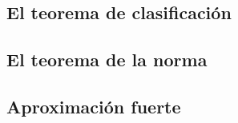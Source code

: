 
\subsection{El teorema de clasificaci\'{o}n}

\subsection{El teorema de la norma}

\subsection{Aproximaci\'{o}n fuerte}



